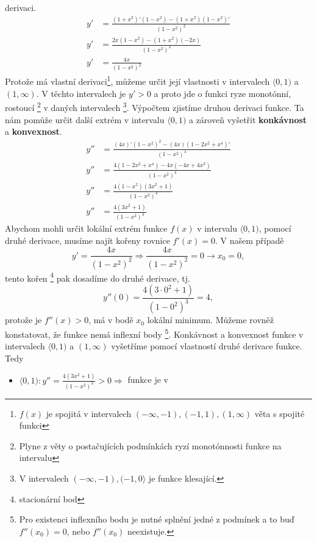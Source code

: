 \begin{example}
\begin{enumerate}
         derivaci.
         \begin{align*}
           y' &= \frac{(1+x^2)'(1-x^2 )-(1+x^2)(1-x^2 )'}{(1-x^2)^2} \\
           y' &= \frac{2x(1-x^2 )-(1+x^2 )(-2x)}{(1-x^2 )^2}         \\
           y' &= \frac{4x}{(1-x^2 )^2}
         \end{align*}
         Protože má vlastní derivaci\footnote{$f(x)$ je spojitá v intervalech $(-\infty,-1), 
         (-1,1),(1,\infty)$  věta s spojité funkci}, můžeme určit její vlastnosti v intervalech 
         $\langle0,1)$ a $(1,\infty)$. V těchto intervalech je $y'>0$ a proto jde o funkci ryze 
         monotónní, rostoucí \footnote{Plyne z věty o postačujících podmínkách ryzí monotónnosti 
         funkce na intervalu} v daných intervalech \footnote{V intervalech $(-\infty,-1) 
         ,(-1,0\rangle$ je funkce klesající.}. Výpočtem zjistíme druhou derivaci funkce. 
         Ta nám pomůže určit další extrém v intervalu $\langle0,1)$ a zároveň vyšetřit 
         \textbf{konkávnost} a \textbf{konvexnost}.
         \begin{align*}
           y'' &= \frac{(4x)' (1-x^2 )^2-(4x)(1-2x^2+x^4 )'}{(1-x^2 )^4}  \\
           y'' &= \frac{4(1-2x^2+x^4 )-4x(-4x+4x^3 )}{(1-x^2 )^4}         \\
           y'' &= \frac{4(1-x^2 )(3x^2+1)}{(1-x^2 )^4}                    \\
           y'' &= \frac{4(3x^2+1)}{(1-x^2 )^3}
         \end{align*}
         Abychom mohli určit lokální extrém funkce $f(x)$ v intervalu $\langle0,1)$, pomocí druhé 
         derivace, musíme najít kořeny rovnice $f' (x)=0$. V našem případě $$y'=\frac{4x}{(1-x^2 
         )^2}\Rightarrow\frac{4x}{(1-x^2)^2}=0\rightarrow x_0=0,$$ tento kořen 
         \footnote{stacionární bod}  pak dosadíme do druhé derivace, tj. 
         $$y''(0)=\frac{4(3\cdot0^2+1)}{(1-0^2 )^3}=4,$$ protože je $f''(x)>0$, má v bodě $x_0$ 
         lokální minimum. Můžeme rovněž konstatovat, že funkce nemá inflexní body \footnote{Pro 
         existenci inflexního bodu je nutné splnění jedné z podmínek a to buď $f''(x_0)=0$, nebo 
         $f''(x_0)$ neexistuje.}. Konkávnost a konvexnost funkce v intervalech $\langle0,1)$ a 
         $(1,\infty)$ vyšetříme pomocí vlastností druhé derivace funkce. Tedy
         \begin{itemize}
           \item $\langle0,1): y''=\frac{4(3x^2+1)}{(1-x^2 )^3} >0 \Rightarrow$ funkce je v 

\end{itemize}
\end{enumerate}
\end{example}
